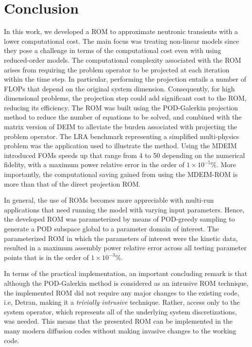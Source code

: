 \documentclass[]{interact}
\theoremstyle{plain}%
\theoremstyle{definition}
\theoremstyle{remark}
\begin{document}
\section{Conclusion}

In this work, we developed a ROM to approximate neutronic transients with a lower computational cost.
The main focus was treating non-linear models since they pose a challenge in terms of the computational cost even with using reduced-order models.
The computational complexity associated with the ROM arises from requiring the problem operator to be projected at each iteration within the time step.
In particular, performing the projection entails a number of FLOPs that depend on the original system dimension.
Consequently, for high dimensional problems, the projection step could add significant cost to the ROM, reducing its efficiency.
The ROM was built using the POD-Galerkin projection method to reduce the number of equations to be solved, and combined with the matrix version of DEIM to alleviate the burden associated with projecting the problem operator.
The LRA benchmark representing a simplified multi-physics problem was the application used to illustrate the method.
Using the MDEIM introduced FOMs speeds up that range from 4 to 50 depending on the numerical fidelity, with a maximum power relative error in the order of $1\times 10^{-5}$\%.
More importantly, the computational saving gained from using the MDEIM-ROM is more than that of the direct projection ROM.

In general, the use of ROMs becomes more appreciable with multi-run applications that need running the model with varying input parameters.
Hence, the developed ROM was parameterized by means of POD-greedy sampling to generate a POD subspace global to a parameter domain of interest.
The parameterized ROM in which the parameters of interest were the kinetic data, resulted in a maximum assembly power relative error across all testing parameter points that is in the order of $1\times 10^{-3}$\%.

In terms of the practical implementation, an important concluding remark is that although the POD-Galerkin method is considered as an intrusive ROM technique, the implemented ROM did not require any major changes to the existing code, i.e, Detran,  making it a {\it trivially intrusive} technique.
Rather, access only to the system operator, which represents all of the underlying system discretizations, was needed.
This means that the presented ROM can be implemented in the many modern diffusion codes without making invasive changes to the working code.




\end{document}
